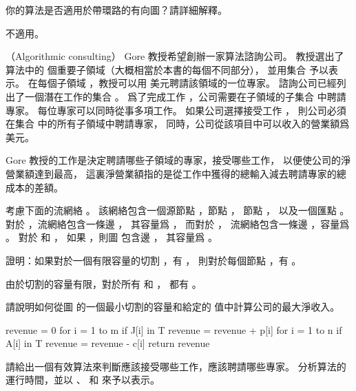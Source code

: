 \startigBase[continue]\startitem
你的算法是否適用於帶環路的有向圖？請詳細解釋。
\stopitem\stopigBase

\startANSWER
不適用。
\stopANSWER

\stopPROBLEM

\startPROBLEM
（Algorithmic consulting）
 Gore 教授希望創辦一家算法諮詢公司。
教授選出了算法中的  個重要子領域（大概相當於本書的每個不同部分），
並用集合  予以表示。
在每個子領域 ，教授可以用  美元聘請該領域的一位專家。
諮詢公司已經列出了一個潛在工作的集合 。
爲了完成工作 ，公司需要在子領域的子集合  中聘請專家。
每位專家可以同時從事多項工作。
如果公司選擇接受工作 ，
則公司必須在集合  中的所有子領域中聘請專家，
同時，公司從該項目中可以收入的營業額爲  美元。

 Gore 教授的工作是決定聘請哪些子領域的專家，接受哪些工作，
以便使公司的淨營業額達到最高，
這裏淨營業額指的是從工作中獲得的總輸入減去聘請專家的總成本的差額。

考慮下面的流網絡 。
該網絡包含一個源節點 ，節點 ，
節點 ，
以及一個匯點 。
對於 ，流網絡包含一條邊 ，
其容量爲 ，
而對於 ，
流網絡包含一條邊 ，容量爲 。
對於  和 ，
如果 ，則圖  包含邊 ，
其容量爲 。

\startigBase[a]\startitem
證明：如果對於一個有限容量的切割 ，有 ，
則對於每個節點 ，有 。
\stopitem\stopigBase

\startANSWER
由於切割的容量有限，對於所有  和 ，
都有 。
\stopANSWER

\startigBase[continue]\startitem
請說明如何從圖  的一個最小切割的容量和給定的  值中計算公司的最大淨收入。
\stopitem\stopigBase

\startANSWER
{}
\startCLRS
revenue = 0
for i = 1 to m
	if J[i] in T
		revenue = revenue + p[i]
for i = 1 to n
	if A[i] in T
		revenue = revenue - c[i]
return revenue
\stopCLRS
\stopANSWER

\startigBase[continue]\startitem
請給出一個有效算法來判斷應該接受哪些工作，應該聘請哪些專家。
分析算法的運行時間，並以 、  和  來予以表示。
\stopitem\stopigBase

